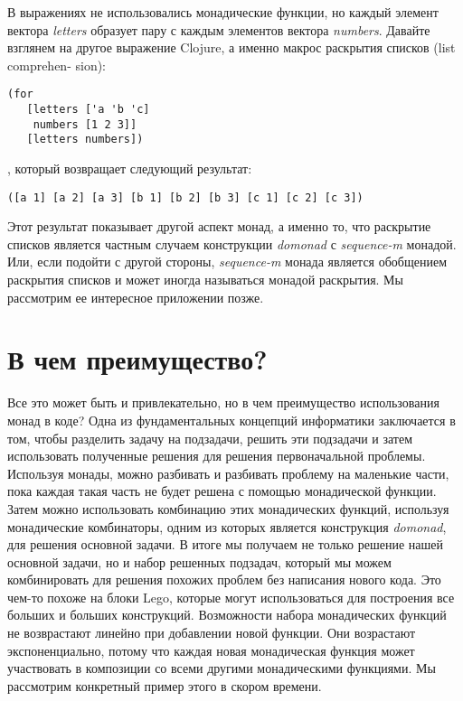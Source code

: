\documentclass[a4paper,12pt]{article}
\newcommand{\cl}[1] {{\it #1}}
\begin{document}
В выражениях не использовались монадические функции, но каждый элемент вектора \cl{letters} образует
пару с каждым элементов вектора \cl{numbers}. Давайте взглянем на другое выражение Clojure, а именно макрос
раскрытия списков (list comprehen- sion):

\begin{verbatim}
(for
   [letters ['a 'b 'c]
    numbers [1 2 3]]
   [letters numbers])
\end{verbatim}
, который возвращает следующий результат:
\begin{verbatim}
([a 1] [a 2] [a 3] [b 1] [b 2] [b 3] [c 1] [c 2] [c 3])
\end{verbatim}

Этот результат показывает другой аспект монад, а именно то, что раскрытие списков
является частным случаем конструкции \cl{domonad} с \cl{sequence-m} монадой. Или, если подойти
с другой стороны, \cl{sequence-m} монада является обобщением раскрытия списков и может иногда
называться монадой раскрытия. Мы рассмотрим ее интересное приложении позже.


\section{В чем преимущество?}\label{but-why}
Все это может быть и привлекательно, но в чем преимущество использования
монад в коде? Одна из фундаментальных концепций информатики заключается в том, чтобы
разделить задачу на подзадачи, решить эти подзадачи и затем использовать
полученные решения для решения первоначальной проблемы. Используя монады, можно разбивать и
разбивать проблему на маленькие части, пока каждая такая часть не будет решена с 
помощью монадической функции. Затем можно использовать комбинацию этих монадических
функций, используя монадические комбинаторы, одним из которых является конструкция 
\cl{domonad}, для решения основной задачи. В итоге мы получаем не только решение нашей
основной задачи, но и набор решенных подзадач, который мы можем комбинировать
для решения похожих проблем без написания нового кода. Это чем-то похоже на блоки Lego,
которые могут использоваться для построения все больших и больших конструкций. Возможности
набора монадических функций не возврастают линейно при добавлении новой 
функции. Они возрастают экспоненциально, потому что каждая новая монадическая
функция может участвовать в композиции со всеми другими монадическими функциями. 
Мы рассмотрим конкретный пример этого в скором времени. 
\end{document}
